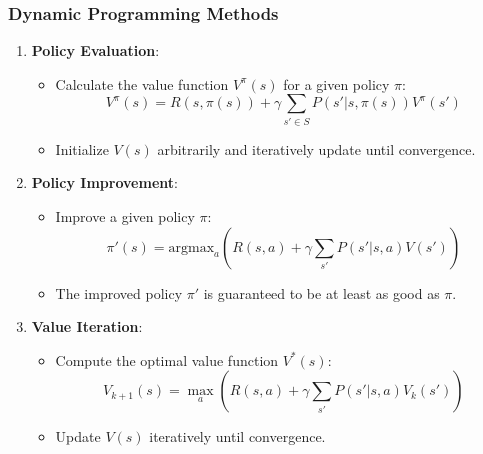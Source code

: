 \documentclass{beamer}
\begin{document}
\begin{frame}[fragile]
    \frametitle{Dynamic Programming Methods}

    \begin{enumerate}
        \item \textbf{Policy Evaluation}:
            \begin{itemize}
                \item Calculate the value function \( V^{\pi}(s) \) for a given policy \( \pi \):
                \begin{equation}
                    V^{\pi}(s) = R(s, \pi(s)) + \gamma \sum_{s' \in S} P(s' | s, \pi(s)) V^{\pi}(s')
                \end{equation}
                \item Initialize \( V(s) \) arbitrarily and iteratively update until convergence.
            \end{itemize}
        
        \item \textbf{Policy Improvement}:
            \begin{itemize}
                \item Improve a given policy \( \pi \):
                \begin{equation}
                    \pi'(s) = \text{argmax}_a \left( R(s, a) + \gamma \sum_{s'} P(s' | s, a) V(s') \right)
                \end{equation}
                \item The improved policy \( \pi' \) is guaranteed to be at least as good as \( \pi \).
            \end{itemize}
        
        \item \textbf{Value Iteration}:
            \begin{itemize}
                \item Compute the optimal value function \( V^*(s) \):
                \begin{equation}
                    V_{k+1}(s) = \max_a \left( R(s, a) + \gamma \sum_{s'} P(s' | s, a) V_k(s') \right)
                \end{equation}
                \item Update \( V(s) \) iteratively until convergence.
            \end{itemize}
    \end{enumerate}
\end{frame}
\end{document}
